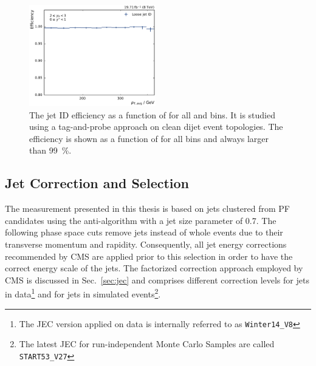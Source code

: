 \begin{figure}[htbp]
    \includegraphics[width=0.49\textwidth]{figures/measurement/jetideff_yb2ys0.pdf}
    \caption[Efficiency of the jet ID]{The jet ID efficiency as a function of
    \ptavg for all \ystar and \yboost bins. It is studied using a
    tag-and-probe approach on clean dijet event topologies. The efficiency is
    shown as a function of \ptavg for all bins and always larger than
    \SI{99}{\percent}.}
    \label{fig:jetid_eff}
\end{figure}

\subsection{Jet Correction and Selection}

The measurement presented in this thesis is based on jets clustered from PF
candidates using the anti-\kt algorithm with a jet size parameter of 0.7. The
following phase space cuts remove jets instead of whole events due to their
transverse momentum and rapidity. Consequently, all jet energy corrections
recommended by CMS are applied prior to this selection in order to have the
correct energy scale of the jets. The factorized correction approach employed by
CMS is discussed in Sec.~\ref{sec:jec} and comprises different correction levels
for jets in data\footnote{The JEC version applied on data is internally referred
to as \texttt{Winter14\_V8}} and for jets in simulated events\footnote{The
latest JEC for run-independent Monte Carlo Samples are called
\texttt{START53\_V27}}.

